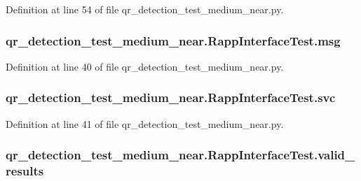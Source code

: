 Definition at line 54 of file qr\-\_\-detection\-\_\-test\-\_\-medium\-\_\-near.\-py.

\hypertarget{classqr__detection__test__medium__near_1_1RappInterfaceTest_af0fc6471dc75a79cc6b04d89579758eb}{
\subsubsection[{msg}]{\setlength{\rightskip}{0pt plus 5cm}qr\-\_\-detection\-\_\-test\-\_\-medium\-\_\-near.\-Rapp\-Interface\-Test.\-msg}}\label{classqr__detection__test__medium__near_1_1RappInterfaceTest_af0fc6471dc75a79cc6b04d89579758eb}


Definition at line 40 of file qr\-\_\-detection\-\_\-test\-\_\-medium\-\_\-near.\-py.

\hypertarget{classqr__detection__test__medium__near_1_1RappInterfaceTest_a2d86a8cd25107afaf759fa80fa820bcc}{
\subsubsection[{svc}]{\setlength{\rightskip}{0pt plus 5cm}qr\-\_\-detection\-\_\-test\-\_\-medium\-\_\-near.\-Rapp\-Interface\-Test.\-svc}}\label{classqr__detection__test__medium__near_1_1RappInterfaceTest_a2d86a8cd25107afaf759fa80fa820bcc}


Definition at line 41 of file qr\-\_\-detection\-\_\-test\-\_\-medium\-\_\-near.\-py.

\hypertarget{classqr__detection__test__medium__near_1_1RappInterfaceTest_a170e7b4dbd6ff937ceb28b9a15732ade}{
\subsubsection[{valid\-\_\-results}]{\setlength{\rightskip}{0pt plus 5cm}qr\-\_\-detection\-\_\-test\-\_\-medium\-\_\-near.\-Rapp\-Interface\-Test.\-valid\-\_\-results}}\label{classqr__detection__test__medium__near_1_1RappInterfaceTest_a170e7b4dbd6ff937ceb28b9a15732ade}


